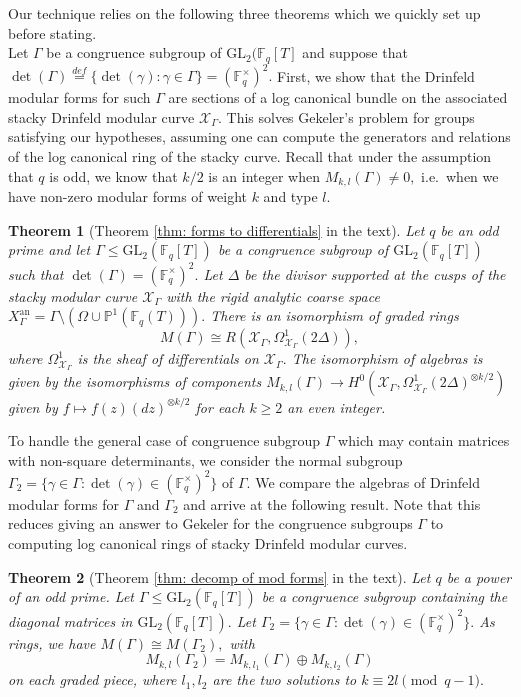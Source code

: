 \documentclass[11pt]{amsart}
\newtheorem{theorem}{Theorem}[section]
\theoremstyle{definition}
\numberwithin{equation}{section}
\newcommand{\GL}{\mathrm{GL}} 	%
\newcommand{\sX}{\mathscr{X}}		%
\newcommand{\bbF}{\mathbb{F}}		%
\newcommand{\bbP}{\mathbb{P}}		%
\begin{document}
		Our technique relies on the following three theorems which we quickly set up before stating.\\
		
		Let $\Gamma$ be a congruence subgroup of $\GL_2(\bbF_q[T]$ and suppose that
		$\displaystyle{\det(\Gamma)\overset{def}{=}\{\det(\gamma):\gamma\in \Gamma\}=(\bbF_q^{\times})^2}.$ First, we show that the Drinfeld modular forms for such $\Gamma$ are sections of a log canonical bundle on the associated stacky Drinfeld modular curve $\sX_{\Gamma}.$ This solves Gekeler's problem for groups satisfying our hypotheses, assuming one can compute the generators and relations of the log canonical ring of the stacky curve. Recall that under the assumption that $q$ is odd, we know that $k/2$ is an integer when $M_{k,l}(\Gamma)\neq 0,$ i.e.\ when we have non-zero modular forms of weight $k$ and type $l.$ 
		\begin{theorem}[Theorem \ref{thm: forms to differentials} in the text]
			Let $q$ be an odd prime and let $\Gamma\leq \GL_2(\bbF_q[T])$ be a congruence subgroup of $\GL_2(\bbF_q[T])$ such that $\det(\Gamma)=(\bbF_q^{\times})^2.$ 
			Let $\Delta$ be the divisor supported at the cusps of the stacky modular curve $\sX_{\Gamma}$ with the rigid analytic coarse space $X_{\Gamma}^{\text{an}}=\Gamma\setminus(\Omega\cup \bbP^1(\bbF_q(T))).$ 
			There is an isomorphism of graded rings \[M(\Gamma)\cong R(\sX_{\Gamma},\Omega^1_{\sX_{\Gamma}}(2\Delta)),\] where $\Omega^1_{\sX_{\Gamma}}$ is the sheaf of differentials on $\sX_{\Gamma}.$ The isomorphism of algebras is given by the isomorphisms of components $M_{k,l}(\Gamma)\to H^0(\sX_{\Gamma},\Omega^1_{\sX_{\Gamma}}(2\Delta)^{\otimes k/2})$ given by $f\mapsto f(z)(dz)^{\otimes k/2}$ for each $k\geq 2$ an even integer.  
		\end{theorem}
		
		To handle the general case of congruence subgroup $\Gamma$ which may contain matrices with non-square determinants, we consider the normal subgroup $\Gamma_2=\{\gamma\in \Gamma: \det(\gamma)\in (\bbF_q^{\times})^2\}$ of $\Gamma.$ We compare the algebras of Drinfeld modular forms for $\Gamma$ and $\Gamma_2$ and arrive at the following result. Note that this reduces giving an answer to Gekeler for the congruence subgroups $\Gamma$ to computing log canonical rings of stacky Drinfeld modular curves.
		\begin{theorem}[Theorem \ref{thm: decomp of mod forms} in the text]
			Let $q$ be a power of an odd prime. Let $\Gamma\leq \GL_2(\bbF_q[T])$ be a congruence subgroup containing the diagonal matrices in $\GL_2(\bbF_q[T]).$ Let $\Gamma_2=\{\gamma\in \Gamma: \det(\gamma)\in (\bbF_q^{\times})^2\}.$ As rings, we have
			$M(\Gamma)\cong M(\Gamma_2),$
			with \[M_{k,l}(\Gamma_2)=M_{k,l_1}(\Gamma)\oplus M_{k,l_2}(\Gamma)\] on each graded piece, where $l_1,l_2$ are the two solutions to $k\equiv 2l\pmod{q-1}.$ 
		\end{theorem}
		
\end{document}
